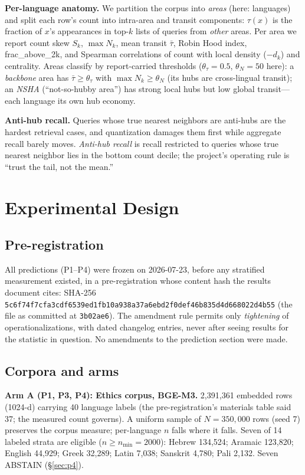 \documentclass[11pt]{article}
\newcommand{\sk}{S_k}
\newcommand{\tmean}{\bar{\tau}}
\begin{document}
\textbf{Per-language anatomy.} We partition the corpus into
\emph{areas} (here: languages) and split each row's count into intra-area
and transit components: $\tau(x)$ is the fraction of $x$'s appearances in
top-$k$ lists of queries from \emph{other} areas. Per area we report count
skew $\sk$, $\max N_k$, mean transit $\tmean$, Robin Hood index,
frac\_above\_2k, and Spearman correlations of count with local density
($-d_k$) and centrality. Areas classify by report-carried thresholds
($\theta_\tau = 0.5$, $\theta_N = 50$ here): a \emph{backbone} area has
$\tmean \ge \theta_\tau$ with $\max N_k \ge \theta_N$ (its hubs are
cross-lingual transit); an \emph{NSHA} (``not-so-hubby area'') has strong
local hubs but low global transit---each language its own hub economy.

\textbf{Anti-hub recall.} Queries whose true nearest neighbors are
anti-hubs are the hardest retrieval cases, and quantization damages them
first while aggregate recall barely moves. \emph{Anti-hub recall} is
recall restricted to queries whose true nearest neighbor lies in the
bottom count decile; the project's operating rule is ``trust the tail,
not the mean.''

\section{Experimental Design}
\label{sec:design}

\subsection{Pre-registration}
All predictions (P1--P4) were frozen on 2026-07-23, before any stratified
measurement existed, in a pre-registration whose content hash the results
document cites: SHA-256
\texttt{5c6f74f7cfa3cdf6539ed1fb10a938a37a6ebd2f0def46b835d4d668022d4b55}
(the file as committed at \texttt{3b02ae6}). The amendment rule permits
only \emph{tightening} of operationalizations, with dated changelog
entries, never after seeing results for the statistic in question. No
amendments to the prediction section were made.

\subsection{Corpora and arms}
\label{sec:corpora}

\textbf{Arm A (P1, P3, P4): Ethics corpus, BGE-M3.} 2{,}391{,}361
embedded rows (1024-d) carrying 40 language labels (the pre-registration's
materials table said 37; the measured count governs). A uniform sample of
$N = 350{,}000$ rows (seed 7) preserves the corpus measure; per-language
$n$ falls where it falls. Seven of 14 labeled strata are eligible
($n \ge n_{\min} = 2000$): Hebrew 134{,}524; Aramaic 123{,}820; English
44{,}929; Greek 32{,}289; Latin 7{,}038; Sanskrit 4{,}780; Pali 2{,}132.
Seven ABSTAIN (\S\ref{sec:p4}).
\end{document}
